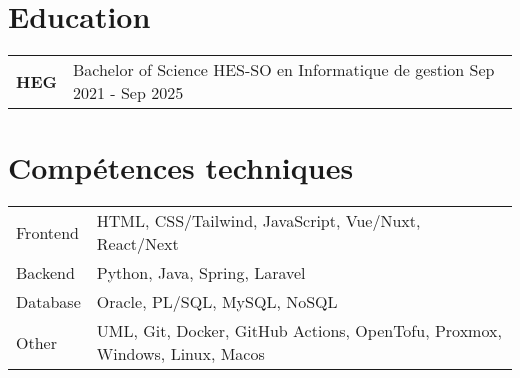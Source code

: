 \documentclass[a4paper,12pt]{article}
\begin{document}
\section{Education}
\begin{tabularx}{\linewidth}{@{}l X@{}}	
\textbf{HEG} & Bachelor of Science HES-SO en Informatique de gestion \hfill \normalsize Sep 2021 - Sep 2025\\

\end{tabularx}


\section{Compétences techniques}
\begin{tabularx}{\linewidth}{@{}l X@{}}
Frontend &  \normalsize{HTML, CSS/Tailwind, JavaScript, Vue/Nuxt, React/Next}\\
Backend  &  \normalsize{Python, Java, Spring, Laravel}\\
Database &  \normalsize{Oracle, PL/SQL, MySQL, NoSQL}\\
Other   &  \normalsize{UML, Git, Docker, GitHub Actions, OpenTofu, Proxmox, Windows, Linux, Macos}\\
\end{tabularx}

\vfill
{}
\end{document}
